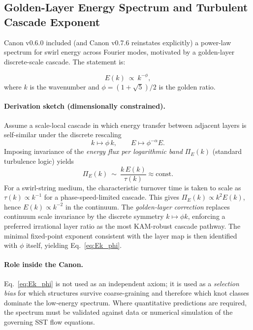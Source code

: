 \documentclass[10pt]{article}
\begin{document}
\subsection{Golden-Layer Energy Spectrum and Turbulent Cascade Exponent}
\label{sec:golden_spectrum}

Canon v0.6.0 included (and Canon v0.7.6 reinstates explicitly) a
power-law spectrum for swirl energy across Fourier modes, motivated by
a golden-layer discrete-scale cascade. The statement is:

\begin{equation}
    E(k)\ \propto\ k^{-\phi},
    \label{eq:Ek_phi}
\end{equation}
where $k$ is the wavenumber and $\phi=(1+\sqrt{5})/2$ is the golden ratio.

\paragraph{Derivation sketch (dimensionally constrained).}
Assume a scale-local cascade in which energy transfer between adjacent
layers is self-similar under the discrete rescaling
\begin{equation}
    k \mapsto \phi\,k,
    \qquad
    E \mapsto \phi^{-\alpha}E.
\end{equation}
Imposing invariance of the \emph{energy flux per logarithmic band}
$\Pi_E(k)$ (standard turbulence logic) yields
\begin{equation}
    \Pi_E(k)\ \sim\ \frac{k\,E(k)}{\tau(k)} \approx \text{const.}
\end{equation}
For a swirl-string medium, the characteristic turnover time is taken to scale
as $\tau(k)\propto k^{-1}$ for a phase-speed-limited cascade. This gives
$\Pi_E(k)\propto k^{2}E(k)$, hence $E(k)\propto k^{-2}$ in the continuum.
The \emph{golden-layer correction} replaces continuum scale invariance by the
discrete symmetry $k\mapsto\phi k$, enforcing a preferred irrational layer
ratio as the most KAM-robust cascade pathway. The minimal fixed-point exponent
consistent with the layer map is then identified with $\phi$ itself, yielding
Eq.~\eqref{eq:Ek_phi}.

\paragraph{Role inside the Canon.}
Eq.~\eqref{eq:Ek_phi} is not used as an independent axiom; it is used as a
\emph{selection bias} for which structures survive coarse-graining and therefore
which knot classes dominate the low-energy spectrum. Where quantitative
predictions are required, the spectrum must be validated against data or
numerical simulation of the governing SST flow equations.
\end{document}
